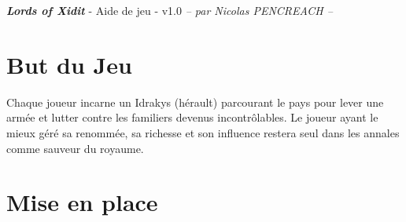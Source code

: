 \documentclass[10pt, a4paper]{article}	%
\begin{document}
{\LARGE \textbf{\textit{Lords of Xidit}}}
{\large - Aide de jeu - v1.0}\textit{ -- par Nicolas PENCREACH --}

\setlength{\columnseprule}{0.002cm}	%
\begin{multicols}{3}				%


\section{But du Jeu} %
\label{sec:but_du_jeu}
Chaque joueur incarne un Idrakys (hérault) parcourant le pays pour lever une armée et lutter contre les familiers devenus incontrôlables.
Le joueur ayant le mieux géré sa renommée, sa richesse et son influence restera seul dans les annales comme sauveur du royaume.


\section{Mise en place} %
\label{sec:mise_en_place}


\end{multicols}
\end{document}
